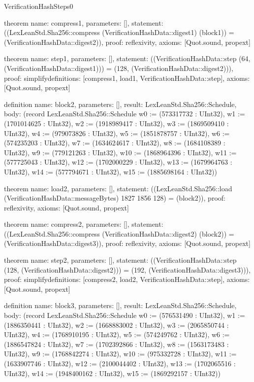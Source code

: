 \begin{lexlean}{VerificationHashSteps0}
\begin{semanticmodule}
theorem{
  name: compress1,
  parameters: [],
  statement: ((LexLeanStd.Sha256::compress (VerificationHashData::digest1) (block1)) = (VerificationHashData::digest2)),
  proof: reflexivity{},
  axioms: [Quot.sound, propext]
}

theorem{
  name: step1,
  parameters: [],
  statement: ((VerificationHashData::step (64, (VerificationHashData::digest1))) = (128, (VerificationHashData::digest2))),
  proof: simplify{definitions: [compress1, load1, VerificationHashData::step]},
  axioms: [Quot.sound, propext]
}

definition{
  name: block2,
  parameters: [],
  result: LexLeanStd.Sha256::Schedule,
  body: (record LexLeanStd.Sha256::Schedule {w0 := (573317732 : UInt32), w1 := (1701014625 : UInt32), w2 := (1918989417 : UInt32), w3 := (1869509410 : UInt32), w4 := (979073826 : UInt32), w5 := (1851878757 : UInt32), w6 := (574235203 : UInt32), w7 := (1634624617 : UInt32), w8 := (1684108389 : UInt32), w9 := (779121263 : UInt32), w10 := (1868964396 : UInt32), w11 := (577725043 : UInt32), w12 := (1702000229 : UInt32), w13 := (1679964763 : UInt32), w14 := (577794671 : UInt32), w15 := (1885698164 : UInt32)})
}

theorem{
  name: load2,
  parameters: [],
  statement: ((LexLeanStd.Sha256::load (VerificationHashData::messageBytes) 1827 1856 128) = (block2)),
  proof: reflexivity{},
  axioms: [Quot.sound, propext]
}

theorem{
  name: compress2,
  parameters: [],
  statement: ((LexLeanStd.Sha256::compress (VerificationHashData::digest2) (block2)) = (VerificationHashData::digest3)),
  proof: reflexivity{},
  axioms: [Quot.sound, propext]
}

theorem{
  name: step2,
  parameters: [],
  statement: ((VerificationHashData::step (128, (VerificationHashData::digest2))) = (192, (VerificationHashData::digest3))),
  proof: simplify{definitions: [compress2, load2, VerificationHashData::step]},
  axioms: [Quot.sound, propext]
}

definition{
  name: block3,
  parameters: [],
  result: LexLeanStd.Sha256::Schedule,
  body: (record LexLeanStd.Sha256::Schedule {w0 := (576531490 : UInt32), w1 := (1886350441 : UInt32), w2 := (1668883002 : UInt32), w3 := (2065850744 : UInt32), w4 := (1768910195 : UInt32), w5 := (574249762 : UInt32), w6 := (1886547824 : UInt32), w7 := (1702392866 : UInt32), w8 := (1563173483 : UInt32), w9 := (1768842274 : UInt32), w10 := (975332728 : UInt32), w11 := (1633907746 : UInt32), w12 := (2100044402 : UInt32), w13 := (1702065516 : UInt32), w14 := (1948400162 : UInt32), w15 := (1869292157 : UInt32)})
}


\end{semanticmodule}
\end{lexlean}
